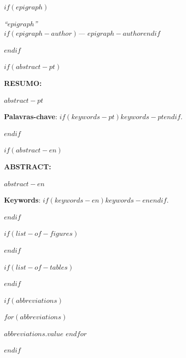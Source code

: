 \documentclass[
  12pt,
  oneside,
  a4paper,
  chapter=TITLE,
  english,
  $if(lang)$$lang$$else$portuguese$endif$
]{abntex2}
\begin{document}
$if(epigraph)$
\newpage
\thispagestyle{empty}
\vspace*{\fill}
\hspace*{8cm}\parbox{8cm}{\normalfont\itshape
  ``$epigraph$''\\
  $if(epigraph-author)$\hfill --- $epigraph-author$$endif$
}
$endif$

$if(abstract-pt)$
\begin{resumoumacoluna}
\noindent\textbf{RESUMO:}\vspace{\onelineskip}

$abstract-pt$

\vspace{\onelineskip}
\noindent\textbf{Palavras-chave}: $if(keywords-pt)$$keywords-pt$$endif$.
\end{resumoumacoluna}
$endif$

$if(abstract-en)$
\renewcommand{\resumoname}{Abstract}
\begin{resumoumacoluna}
\noindent\textbf{ABSTRACT:}\vspace{\onelineskip}

$abstract-en$

\vspace{\onelineskip}
\noindent\textbf{Keywords}: $if(keywords-en)$$keywords-en$$endif$.
\end{resumoumacoluna}
$endif$

$if(list-of-figures)$
\listoffigures*
\cleardoublepage
$endif$

$if(list-of-tables)$
\listoftables*
\cleardoublepage
$endif$

$if(abbreviations)$
\begin{siglas}
$for(abbreviations)$
  \item[$abbreviations.key$] $abbreviations.value$
$endfor$
\end{siglas}
$endif$
\end{document}
